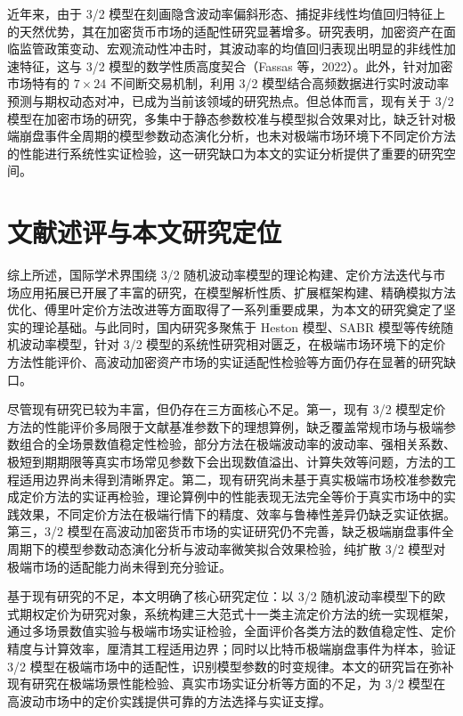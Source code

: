 近年来，由于 3/2 模型在刻画隐含波动率偏斜形态、捕捉非线性均值回归特征上的天然优势，其在加密货币市场的适配性研究显著增多。研究表明，加密资产在面临监管政策变动、宏观流动性冲击时，其波动率的均值回归表现出明显的非线性加速特征，这与 3/2 模型的数学性质高度契合（Fassas 等，2022）。此外，针对加密市场特有的 $7\times24$ 不间断交易机制，利用 3/2 模型结合高频数据进行实时波动率预测与期权动态对冲，已成为当前该领域的研究热点。但总体而言，现有关于 3/2 模型在加密市场的研究，多集中于静态参数校准与模型拟合效果对比，缺乏针对极端崩盘事件全周期的模型参数动态演化分析，也未对极端市场环境下不同定价方法的性能进行系统性实证检验，这一研究缺口为本文的实证分析提供了重要的研究空间。

\section{文献述评与本文研究定位}

综上所述，国际学术界围绕 3/2 随机波动率模型的理论构建、定价方法迭代与市场应用拓展已开展了丰富的研究，在模型解析性质、扩展框架构建、精确模拟方法优化、傅里叶定价方法改进等方面取得了一系列重要成果，为本文的研究奠定了坚实的理论基础。与此同时，国内研究多聚焦于 Heston 模型、SABR 模型等传统随机波动率模型，针对 3/2 模型的系统性研究相对匮乏，在极端市场环境下的定价方法性能评价、高波动加密资产市场的实证适配性检验等方面仍存在显著的研究缺口。

尽管现有研究已较为丰富，但仍存在三方面核心不足。第一，现有 3/2 模型定价方法的性能评价多局限于文献基准参数下的理想算例，缺乏覆盖常规市场与极端参数组合的全场景数值稳定性检验，部分方法在极端波动率的波动率、强相关系数、极短到期期限等真实市场常见参数下会出现数值溢出、计算失效等问题，方法的工程适用边界尚未得到清晰界定。第二，现有研究尚未基于真实极端市场校准参数完成定价方法的实证再检验，理论算例中的性能表现无法完全等价于真实市场中的实践效果，不同定价方法在极端行情下的精度、效率与鲁棒性差异仍缺乏实证依据。第三，3/2 模型在高波动加密货币市场的实证研究仍不完善，缺乏极端崩盘事件全周期下的模型参数动态演化分析与波动率微笑拟合效果检验，纯扩散 3/2 模型对极端市场的适配能力尚未得到充分验证。

基于现有研究的不足，本文明确了核心研究定位：以 3/2 随机波动率模型下的欧式期权定价为研究对象，系统构建三大范式十一类主流定价方法的统一实现框架，通过多场景数值实验与极端市场实证检验，全面评价各类方法的数值稳定性、定价精度与计算效率，厘清其工程适用边界；同时以比特币极端崩盘事件为样本，验证 3/2 模型在极端市场中的适配性，识别模型参数的时变规律。本文的研究旨在弥补现有研究在极端场景性能检验、真实市场实证分析等方面的不足，为 3/2 模型在高波动市场中的定价实践提供可靠的方法选择与实证支撑。